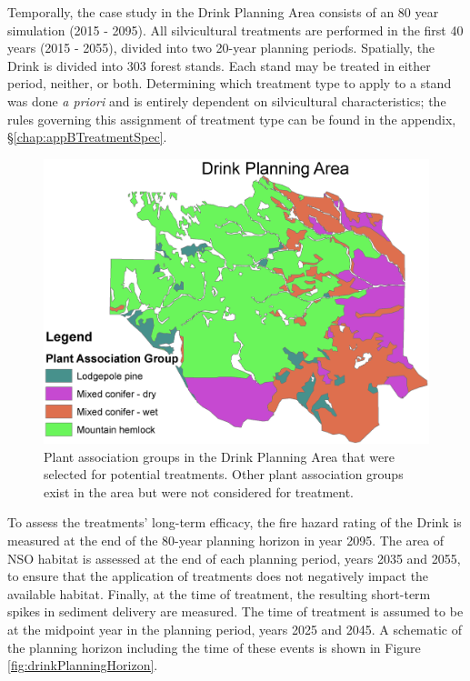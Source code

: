Temporally, the case study in the Drink Planning Area consists of an 80 year simulation (2015 - 2095). All silvicultural treatments are performed in the first 40 years (2015 - 2055), divided into two 20-year planning periods. Spatially, the Drink is divided into 303 forest stands. Each stand may be treated in either period, neither, or both. Determining which treatment type to apply to a stand was done \textit{a priori} and is entirely dependent on silvicultural characteristics; the rules governing this assignment of treatment type can be found in the appendix, \S \ref{chap:appBTreatmentSpec}.

\begin{figure}
\centering
\includegraphics[width=.5\textwidth]{../images/DrinkMap_PAGs}
\caption[Plant association groups in the Drink Planning Area]{Plant association groups in the Drink Planning Area that were selected for potential treatments. Other plant association groups exist in the area but were not considered for treatment.}
\label{fig:drinkPAGs}
\end{figure}

To assess the treatments' long-term efficacy, the fire hazard rating of the Drink is measured at the end of the 80-year planning horizon in year 2095. The area of NSO habitat is assessed at the end of each planning period, years 2035 and 2055, to ensure that the application of treatments does not negatively impact the available habitat. Finally, at the time of treatment, the resulting short-term spikes in sediment delivery are measured. The time of treatment is assumed to be at the midpoint year in the planning period, years 2025 and 2045. A schematic of the planning horizon including the time of these events is shown in Figure \ref{fig:drinkPlanningHorizon}.

